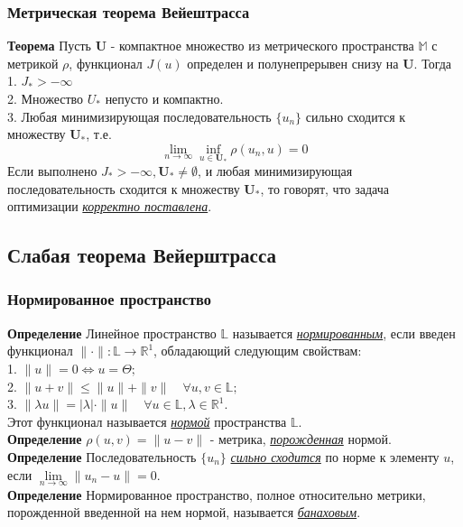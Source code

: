 \documentclass[A4]{article}
\begin{document}
\subsubsection{Метрическая теорема Вейештрасса}
\textbf{Теорема} Пусть $\mathbf{U}$ - компактное множество из метрического пространства $\mathbb{M}$ с метрикой $\rho$, функционал $J(u)$ определен и полунепрерывен снизу на $\mathbf{U}$. Тогда\\
1. $J_*>-\infty$\\
2. Множество $U_*$ непусто и компактно.\\
3. Любая минимизирующая последовательность $\{u_n\}$ сильно сходится к множеству $\mathbf{U}_*$, т.е.
\begin{equation*}
\lim_{n\rightarrow\infty}\inf_{u\in\mathbf{U}_*}\rho(u_n,u)=0
\end{equation*}
Если выполнено $J_*>-\infty,\mathbf{U}_*\ne\emptyset$, и любая минимизирующая последовательность сходится к множеству $\mathbf{U}_*$, то говорят, что задача оптимизации \underline{\emph{корректно поставлена}}.
\subsection{Слабая теорема Вейерштрасса}
\subsubsection{Нормированное пространство}
\textbf{Определение} Линейное пространство $\mathbb{L}$ называется \underline{\emph{нормированным}}, если введен функционал $\|\cdot\|:\mathbb{L}\rightarrow\mathbb{R}^1$, обладающий следующим свойствам:\\
1. $\|u\|=0\Leftrightarrow u=\Theta;$\\
2. $\|u+v\|\leqslant\|u\|+\|v\|\quad \forall u,v\in\mathbb{L};$\\
3. $\|\lambda u\|=|\lambda|\cdot\|u\|\quad\forall u\in\mathbb{L},\lambda\in\mathbb{R}^1.$\\
Этот функционал называется \underline{\emph{нормой}} пространства $\mathbb{L}$.\\
\textbf{Определение} $\rho(u,v)=\|u-v\|$ - метрика, \underline{\emph{порожденная}} нормой.\\
\textbf{Определение} Последовательность $\{u_n\}$ \underline{\emph{сильно сходится}} по норме к элементу $u$, если $\lim\limits_{n\rightarrow\infty}\|u_n-u\|=0$.\\
\textbf{Определение} Нормированное пространство, полное относительно метрики, порожденной введенной на нем нормой, называется \underline{\emph{банаховым}}.\\
\end{document}
